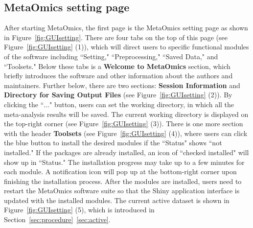 \subsection{MetaOmics setting page}
\label{sec:setting}
After starting MetaOmics, 
the first page is the MetaOmics setting page as shown in Figure~\ref{fig:GUIsetting}.  
There are four tabs on the top of this page (see Figure~\ref{fig:GUIsetting} {\color{red} (1)}), 
which will direct users to specific functional modules of the software including ``Setting," ``Preprocessing," ``Saved Data," and ``Toolsets."
Below these tabs is a {\bf Welcome to MetaOmics} section, which briefly introduces the software and other information about the authors and maintainers.
Further below, there are two sections: {\bf Session Information} and {\bf Directory for Saving Output Files} (see Figure~\ref{fig:GUIsetting} {\color{red} (2)}).
By clicking the ``$\ldots$" button,
users can set the working directory, in which all the meta-analysis results will be saved.
The current working directory is displayed on the top-right corner (see Figure~\ref{fig:GUIsetting} {\color{red} (3)}).
There is one more section with the header {\bf Toolsets} (see Figure~\ref{fig:GUIsetting} {\color{red} (4)}),
where users can click the blue button to install the desired modules if the ``Status" shows ``not installed."
If the packages are already installed, an icon of ``checked installed" will show up in ``Status."
The installation progress may take up to a few minutes for each module.
A notification icon will pop up at the bottom-right corner upon finishing the installation process. 
After the modules are installed, users need to restart the MetaOmics software suite so that the Shiny application interface is updated with the installed modules.
The current active dataset is shown in Figure~\ref{fig:GUIsetting} {\color{red} (5)},
which is introduced in Section~\ref{sec:procedure}~\ref{sec:active}. 
 
